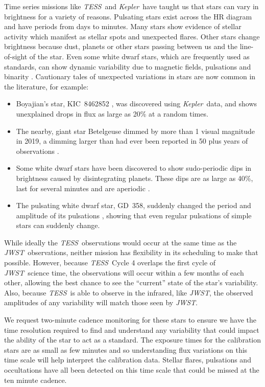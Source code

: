 \documentclass[letterpaper,12pt]{article}
\newcommand{\tess}{{\it TESS}}
\newcommand{\jwst}{{\it JWST}}
\newcommand{\kepler}{{\it Kepler}}
\begin{document}
Time series missions like \tess\ and \kepler\ have taught us that stars can vary in brightness for a variety of reasons. Pulsating stars exist across the HR diagram and have periods from days to minutes. Many stars show evidence of stellar activity which manifest as stellar spots and unexpected flares. Other stars change brightness because dust, planets or other stars passing between us and the line-of-sight of the star. Even some white dwarf stars, which are frequently used as standards, can show dynamic variability due to magnetic fields, pulsations and binarity \citep{Hermes2017}. Cautionary tales of unexpected variations in stars are now common in the literature, for example: 
\begin{itemize}
    \item  Boyajian's star, KIC~8462852 \citep{Boyajian2016}, was discovered using \kepler\ data, and shows unexplained drops in flux as large as 20\% at a random times.
    \item The nearby, giant star Betelgeuse \citep{Guinan2019} dimmed by more than 1 visual magnitude in 2019, a dimming larger than had ever been reported in 50 plus years of observations \citep{Levesque2020ApJ}.
    \item Some white dwarf stars have been discovered to show sudo-periodic dips in brightness caused by disintegrating planets. These dips are as large as 40\%, last for several minutes and are aperiodic \citep{Vanderburg2015}.
    \item The pulsating white dwarf star, GD~358, suddenly changed the period and amplitude of its pulsations \citep{Montgomery2010}, showing that even regular pulsations of simple stars can suddenly change.
\end{itemize}

While ideally the \tess\ observations would occur at the same time as the \jwst\ observations, neither mission has flexibility in its scheduling to make that possible.  However, because \tess\ Cycle 4 overlaps the first cycle of \jwst\ science time, the observations will occur within a few months of each other, allowing the best chance to see the ``current'' state of the star's variability. Also, because \tess\ is able to observe in the infrared, like \jwst, the observed amplitudes of any variability will match those seen by \jwst.

We request two-minute cadence monitoring for these stars to ensure we have the time resolution required to find and understand any variability that could impact the ability of the star to act as a standard. The exposure times for the calibration stars are as small as few minutes and so understanding flux variations on this time scale will help interpret the calibration data. Stellar flares, pulsations and occultations have all been detected on this time scale that could be missed at the ten minute cadence.
\end{document}

